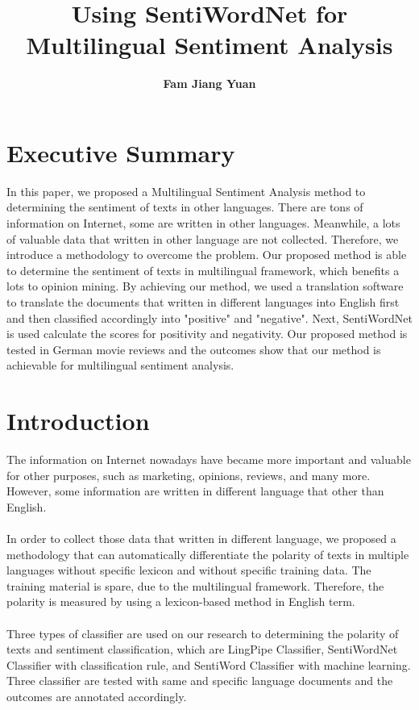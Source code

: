 \documentclass[a4papaer.12pt]{article}
\begin{document}


\title{\textbf{Using SentiWordNet for Multilingual Sentiment Analysis}}
\author{\textbf{Fam Jiang Yuan}}

\maketitle

\section*{\textbf{Executive Summary}}
In this paper, we proposed a Multilingual Sentiment Analysis method to determining the sentiment of texts in other languages. There are tons of information on Internet, some are written in other languages. Meanwhile, a lots of valuable data that written in other language are not collected. Therefore, we introduce a methodology to overcome the problem. Our proposed method is able to determine the sentiment of texts in multilingual framework, which benefits a lots to opinion mining. By achieving our method, we used a translation software to translate the documents that written in different languages into English first and then classified accordingly into "positive" and "negative". Next, SentiWordNet is used calculate the scores for positivity and negativity. Our proposed method is tested in German movie reviews and the outcomes show that our method is achievable for multilingual sentiment analysis.
 
\section*{\textbf{Introduction}}
The information on Internet nowadays have became more important and valuable for other purposes, such as marketing, opinions, reviews, and many more. However, some information are written in different language that other than English. 
\\
\\
In order to collect those data that written in different language, we proposed a methodology that can automatically differentiate the polarity of texts in multiple languages without specific lexicon and without specific training data. The training material is spare, due to the multilingual framework. Therefore, the polarity is measured by using a lexicon-based method in English term.
\\
\\  
Three types of classifier are used on our research to determining the polarity of texts and sentiment classification, which are LingPipe Classifier, SentiWordNet Classifier with classification rule, and SentiWord Classifier with machine learning. Three classifier are tested with same and specific language documents and the outcomes are annotated accordingly. 
\end{document}
